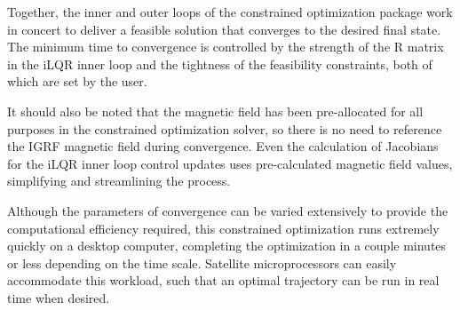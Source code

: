\documentclass[letterpaper, preprint, paper,11pt]{IAA-AAS}	%
\begin{document}
%
%

Together, the inner and outer loops of the constrained optimization package work in concert to deliver a feasible solution that converges to the desired final state. The minimum time to convergence is controlled by the strength of the R matrix in the iLQR inner loop and the tightness of the feasibility constraints, both of which are set by the user. 

It should also be noted that the magnetic field has been pre-allocated for all purposes in the constrained optimization solver, so there is no need to reference the IGRF magnetic field during convergence. Even the calculation of Jacobians for the iLQR inner loop control updates uses pre-calculated magnetic field values, simplifying and streamlining the process. 

Although the parameters of convergence can be varied extensively to provide the computational efficiency required, this constrained optimization runs extremely quickly on a desktop computer, completing the optimization in a couple minutes or less depending on the time scale. Satellite microprocessors can easily accommodate this workload, such that an optimal trajectory can be run in real time when desired. 
\end{document}
